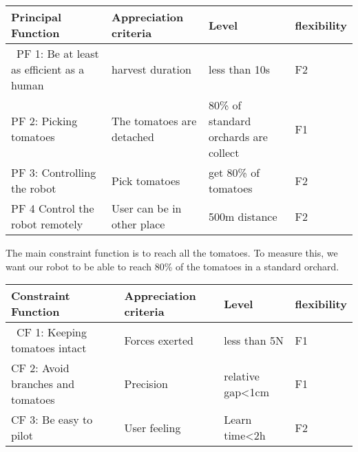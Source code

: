 \begin{center}
    \begin{tabular}{|p{3cm} | p{3cm} | p{3cm} | p{3cm} |} 
        \hline
        \textbf{Principal Function} & \textbf{Appreciation criteria} & \textbf{Level} & \textbf{flexibility} \\ [0.5ex] 
        \hline\
        PF 1: Be at least as efficient as a human & harvest duration & less than 10s & F2 \\ 
        \hline
        PF 2: Picking tomatoes & The tomatoes are detached & 80\% of standard orchards are collect & F1 \\
        \hline
        PF 3: Controlling the robot & Pick tomatoes & get 80\% of tomatoes & F2 \\
        \hline
        PF 4 Control the robot remotely  & User can be in other place & 500m distance & F2 \\
        \hline
    \end{tabular}
\end{center}

\bigbreak

The main constraint function is to reach all the tomatoes. To measure this, we want our robot to be able to reach 80\% of the tomatoes in a standard orchard. 

\begin{center}
    \begin{tabular}{|p{3cm} | p{3cm} | p{3cm} | p{3cm} |} 
        \hline
        \textbf{Constraint Function} & \textbf{Appreciation criteria} & \textbf{Level} & \textbf{flexibility} \\ [0.5ex] 
        \hline\
        CF 1: Keeping tomatoes intact & Forces exerted & less than 5N & F1 \\ 
        \hline
        CF 2: Avoid branches and tomatoes & Precision & relative gap<1cm & F1 \\
        \hline
        CF 3: Be easy to pilot & User feeling & Learn time<2h & F2 \\
        \hline
    \end{tabular}
\end{center}